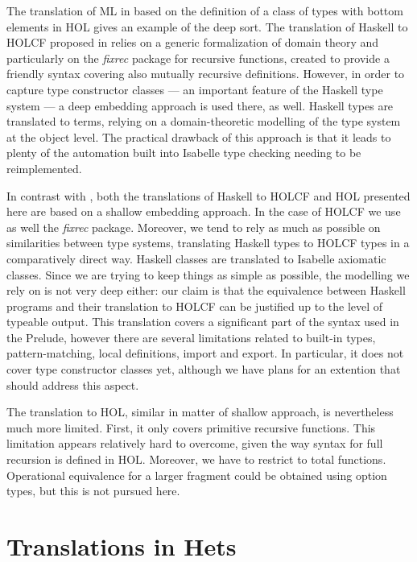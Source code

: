 \documentclass{llncs}
\begin{document}
The translation of ML in \cite{Pollack} based on the definition of a class of
types with bottom elements in HOL gives an example of the deep sort. The
translation of Haskell to HOLCF proposed in \cite{Huff} relies on a generic
formalization of domain theory and particularly on the \emph{fixrec} package
for recursive functions, created to provide a friendly syntax covering also
mutually recursive definitions.  However, in order to capture type constructor
classes --- an important feature of the Haskell type system --- a deep
embedding approach is used there, as well.  Haskell types are translated to
terms, relying on a domain-theoretic modelling of the type system at the
object level. The practical drawback of this approach is that it leads to
plenty of the automation built into Isabelle type checking needing to be
reimplemented.

In contrast with \cite{Huff}, both the translations of Haskell to HOLCF and
HOL presented here are based on a shallow embedding approach. In the case of
HOLCF we use as well the \emph{fixrec} package. Moreover, we tend to rely as
much as possible on similarities between type systems, translating Haskell
types to HOLCF types in a comparatively direct way. Haskell classes are
translated to Isabelle axiomatic classes. Since we are trying to keep things
as simple as possible, the modelling we rely on is not very deep either: our
claim is that the equivalence between Haskell programs and their translation
to HOLCF can be justified up to the level of typeable output. This translation
covers a significant part of the syntax used in the Prelude, however there are
several limitations related to built-in types, pattern-matching, local
definitions, import and export. In particular, it does not cover type
constructor classes yet, although we have plans for an extention that should
address this aspect.

The translation to HOL, similar in matter of shallow approach, is nevertheless
much more limited. First, it only covers primitive recursive functions.  This
limitation appears relatively hard to overcome, given the way syntax for full
recursion is defined in HOL. Moreover, we have to restrict to total functions.
Operational equivalence for a larger fragment could be obtained using option
types, but this is not pursued here.


\section{Translations in Hets}
\end{document}
